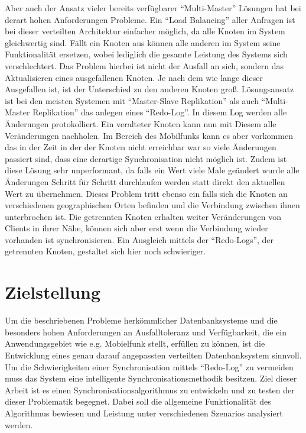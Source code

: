 \documentclass[a4paper,11pt,oneside,%
headsepline,												%
footsepline,												%
bibtotocnumbered									%
]{scrreprt}
\begin{document}
 Aber auch der Ansatz vieler bereits verfügbarer \enquote{Multi-Master} Lösungen hat bei derart hohen Anforderungen Probleme. Ein \enquote{Load Balancing} aller Anfragen ist bei dieser verteilten Architektur einfacher möglich, da alle Knoten im System gleichwertig sind. Fällt ein Knoten aus können alle anderen im System seine Funktionalität ersetzen, wobei lediglich die gesamte Leistung des Systems sich verschlechtert. Das Problem hierbei ist nicht der Ausfall an sich, sondern das Aktualisieren eines ausgefallenen Knoten. Je nach dem wie lange dieser Ausgefallen ist, ist der Unterschied zu den anderen Knoten groß. Lösungsansatz ist bei den meisten Systemen mit \enquote{Master-Slave Replikation} als auch \enquote{Multi-Master Replikation} das anlegen eines \enquote{Redo-Log}. In diesem Log werden alle Änderungen protokolliert. Ein veralteter Knoten kann nun mit Diesem alle Veränderungen nachholen. Im Bereich des Mobilfunks kann es aber vorkommen das in der Zeit in der der Knoten nicht erreichbar war so viele Änderungen passiert sind, dass eine derartige Synchronisation nicht möglich ist. Zudem ist diese Lösung sehr unperformant, da falls ein Wert viele Male geändert wurde alle Änderungen Schritt für Schritt durchlaufen werden statt direkt den aktuellen Wert zu übernehmen. Dieses Problem tritt ebenso ein falls sich die Knoten an verschiedenen geographischen Orten befinden und die Verbindung zwischen ihnen unterbrochen ist. Die getrennten Knoten erhalten weiter Veränderungen von Clients in ihrer Nähe, können sich aber erst wenn die Verbindung wieder vorhanden ist synchronisieren. Ein Ausgleich mittels der \enquote{Redo-Logs}, der getrennten Knoten, gestaltet sich hier noch schwieriger.


\section{Zielstellung}
Um die beschriebenen Probleme herkömmlicher Datenbanksysteme und die besonders hohen Anforderungen an Ausfalltoleranz und Verfügbarkeit, die ein Anwendungsgebiet wie e.g. Mobielfunk stellt, erfüllen zu können, ist die Entwicklung eines genau darauf angepassten verteilten Datenbanksystem sinnvoll. Um die Schwierigkeiten einer Synchronisation mittels \enquote{Redo-Log} zu vermeiden muss das System eine intelligente Synchronisationsmethodik besitzen. Ziel dieser Arbeit ist es einen Synchronisationsalgorithmus zu entwickeln und zu testen der dieser Problematik begegnet. Dabei soll die allgemeine Funktionalität des Algorithmus bewiesen und Leistung unter verschiedenen Szenarios analysiert werden.
\end{document}
